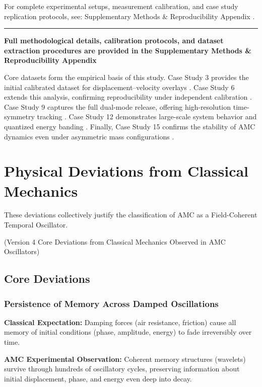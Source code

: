 \documentclass[10pt,aps,pre,onecolumn,superscriptaddress,notitlepage]{revtex4-2}
\begin{document}
For complete experimental setups, measurement calibration, and case study replication protocols, see: Supplementary Methods \& Reproducibility Appendix \cite{karim2025methods}.  

\noindent\rule{\linewidth}{0.4pt}  

\textbf{Full methodological details, calibration protocols, and dataset extraction procedures are provided in the Supplementary Methods \& Reproducibility Appendix \cite{karim2025methods}}


Core datasets form the empirical basis of this study. Case Study 3 provides the initial calibrated dataset for displacement–velocity overlays \cite{karim2025cs3}. 
Case Study 6 extends this analysis, confirming reproducibility under independent calibration \cite{karim2025cs6}. 
Case Study 9 captures the full dual-mode release, offering high-resolution time-symmetry tracking \cite{karim2025cs9}. 
Case Study 12 demonstrates large-scale system behavior and quantized energy banding \cite{karim2025cs12}. 
Finally, Case Study 15 confirms the stability of AMC dynamics even under asymmetric mass configurations \cite{karim2025cs15}.

\section{Physical Deviations from Classical Mechanics}
\label{sec:deviations}

These deviations collectively justify the classification of AMC as a Field-Coherent Temporal Oscillator.  

(Version 4 Core Deviations from Classical Mechanics Observed in AMC Oscillators)

\subsection{Core Deviations}

\subsubsection{Persistence of Memory Across Damped Oscillations}
\label{sec:dev1PersistenceofMemory}
\textbf{Classical Expectation:}  
Damping forces (air resistance, friction) cause all memory of initial conditions (phase, amplitude, energy) to fade irreversibly over time.

\textbf{AMC Experimental Observation:}  
Coherent memory structures (wavelets) survive through hundreds of oscillatory cycles, preserving information about initial displacement, phase, and energy even deep into decay.
\end{document}
